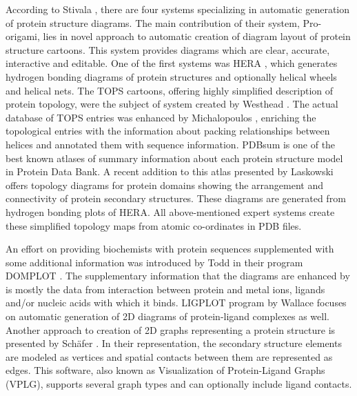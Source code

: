 \documentclass[twocolumn]{bmcart}%
\begin{document}
According to Stivala \cite{Stivala2011}, there are four systems specializing in automatic generation of protein structure diagrams.
The main contribution of their system, Pro-origami, lies in novel approach to automatic creation of diagram layout of protein structure cartoons.
This system provides diagrams which are clear, accurate, interactive and editable.
One of the first systems was HERA \cite{Hutchinson1990}, which generates hydrogen bonding diagrams of protein structures and optionally helical wheels and helical nets.
The TOPS cartoons, offering highly simplified description of protein topology, were the subject of system created by Westhead \cite{Westhead1999}.
The actual database of TOPS entries was enhanced by Michalopoulos \cite{Michalopoulos2004}, enriching the topological entries with the information about packing relationships between helices and annotated them with sequence information.
PDBsum is one of the best known atlases of summary information about each protein structure model in Protein Data Bank.
A recent addition to this atlas presented by Laskowski \cite{Laskowski2009} offers topology diagrams for protein domains showing the arrangement and connectivity of protein secondary structures.
These diagrams are generated from hydrogen bonding plots of HERA.
All above-mentioned expert systems create these simplified topology maps from atomic co-ordinates in PDB files.

An effort on providing biochemists with protein sequences supplemented with some additional information was introduced by Todd in their program DOMPLOT \cite{Todd1999}.
The supplementary information that the diagrams are enhanced by is mostly the data from interaction between protein and metal ions, ligands and/or nucleic acids with which it binds.
LIGPLOT \cite{Wallace1995} program by Wallace focuses on automatic generation of 2D diagrams of protein-ligand complexes as well.
Another approach to creation of 2D graphs representing a protein structure is presented by Sch{\"a}fer \cite{Schafer2012}.
In their representation, the secondary structure elements are modeled as vertices and spatial contacts between them are represented as edges.
This software, also known as Visualization of Protein-Ligand Graphs (VPLG), supports several graph types and can optionally include ligand contacts.
\end{document}
